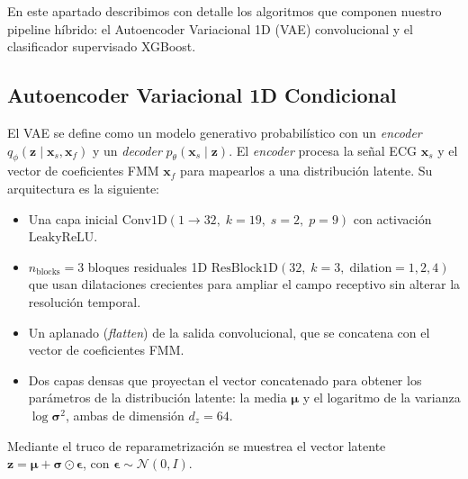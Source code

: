\documentclass[11pt]{article}
\begin{document}


En este apartado describimos con detalle los algoritmos que componen nuestro pipeline híbrido: el Autoencoder Variacional 1D (VAE) convolucional y el clasificador supervisado XGBoost.


\subsection{Autoencoder Variacional 1D Condicional}

El VAE se define como un modelo generativo probabilístico con un \textit{encoder} 
\(
q_\phi(\mathbf{z} \mid \mathbf{x}_s, \mathbf{x}_f)
\)
y un \textit{decoder} 
\(
p_\theta(\mathbf{x}_s \mid \mathbf{z}).
\)
El \textit{encoder} procesa la señal ECG $\mathbf{x}_s$ y el vector de coeficientes FMM $\mathbf{x}_f$ para mapearlos a una distribución latente. Su arquitectura es la siguiente:
\vspace{-0.2em}
\begin{itemize}
    \item Una capa inicial $\mathrm{Conv1D}(1\to32,\; k=19,\; s=2,\; p=9)$ con activación $\mathrm{LeakyReLU}$.
    \vspace{-0.2em}
    \item $n_{\mathrm{blocks}}=3$ bloques residuales 1D 
    \(
       \mathrm{ResBlock1D}(32,\; k=3,\; \mathrm{dilation} = 1,2,4)
    \)
    que usan dilataciones crecientes para ampliar el campo receptivo sin alterar la resolución temporal.
    \vspace{-0.2em}
    \item Un aplanado (\textit{flatten}) de la salida convolucional, que se concatena con el vector de coeficientes FMM. %
    \vspace{-0.2em}
   \item Dos capas densas que proyectan el vector concatenado para obtener los parámetros de la distribución latente: la media $\boldsymbol{\mu}$ y el logaritmo de la varianza $\log\boldsymbol{\sigma}^2$, ambas de dimensión $d_z=64$.
\end{itemize}

Mediante el truco de reparametrización se muestrea el vector latente $\mathbf{z} = \boldsymbol{\mu} + \boldsymbol{\sigma} \odot \boldsymbol{\epsilon}$, con $\boldsymbol{\epsilon} \sim \mathcal{N}(0, I)$. 
\end{document}
